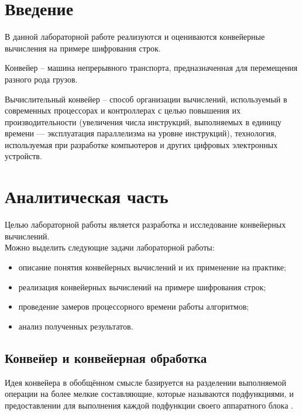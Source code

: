 \documentclass[12pt,a4paper]{report}
\begin{document}

\tableofcontents

\newpage
\chapter*{Введение}

В данной лабораторной работе реализуются и оцениваются конвейерные вычисления на примере шифрования строк.

Конвейер -- машина непрерывного транспорта, предназначенная для перемещения разного рода грузов.

Вычислительный конвейер -- способ организации вычислений, используемый в современных процессорах и контроллерах с 
целью повышения их производительности (увеличения числа инструкций, выполняемых в единицу времени — эксплуатация 
параллелизма на уровне инструкций), технология, используемая при разработке компьютеров и других цифровых 
электронных устройств.

\newpage
\chapter{Аналитическая часть}

Целью лабораторной работы является разработка и исследование конвейерных вычислений.\\

Можно выделить следующие задачи лабораторной работы:
\begin{itemize}
    \item описание понятия конвейерных вычислений и их применение на практике;
    \item реализация конвейерных вычислений на примере шифрования строк;
    \item проведение замеров процессорного времени работы алгоритмов;
    \item анализ полученных результатов.
\end{itemize}

\section{Конвейер и конвейерная обработка}

Идея конвейера в обобщённом смысле базируется на разделении выполняемой операции на более мелкие составляющие, 
которые называются подфункциями, и предоставлении для выполнения каждой подфункции своего аппаратного блока \cite{analyse_info}.
\end{document}
